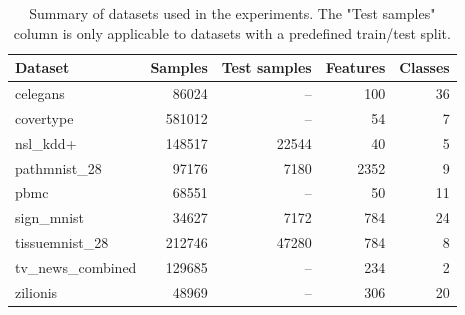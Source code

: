 \begin{table}[t]
\centering
\begin{tabular}{lrrrr}
\toprule
Dataset & Samples & Test samples & Features & Classes \\
\midrule
celegans & 86024 & -- & 100 & 36 \\
covertype & 581012 & -- & 54 & 7 \\
nsl_kdd+ & 148517 & 22544 & 40 & 5 \\
pathmnist_28 & 97176 & 7180 & 2352 & 9 \\
pbmc & 68551 & -- & 50 & 11 \\
sign_mnist & 34627 & 7172 & 784 & 24 \\
tissuemnist_28 & 212746 & 47280 & 784 & 8 \\
tv_news_combined & 129685 & -- & 234 & 2 \\
zilionis & 48969 & -- & 306 & 20 \\
\bottomrule
\end{tabular}
\caption{Summary of datasets used in the experiments. The "Test samples" column is only applicable to datasets with a predefined train/test split.}
\label{tab:dataset_summary}
\end{table}